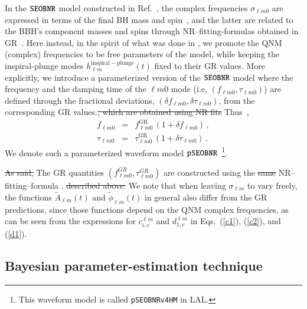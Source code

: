 In the $\texttt{SEOBNR}$ model constructed in Ref.~\cite{Cotesta:2018fcv}, the
complex frequencies $\sigma_{\ell m 0}$ are expressed in terms of the
final BH mass and spin~\cite{Berti:2005ys,Berti:2009kk}, and the
latter are related to the BBH's component masses and spins through
NR--fitting-formulas obtained in
GR~\cite{Taracchini:2013rva,Hofmann:2016yih}. Here instead, in the
spirit of what was done in \paperone, we promote the QNM (complex)
frequencies to be free parameters of the model, while keeping the
inspiral-plunge modes $h_{\ell m}^\mathrm{inspiral-plunge}(t)$ fixed
to their GR values. More explicitly, we introduce a parameterized
version of the $\texttt{SEOBNR}$ model where the frequency and the
damping time of the ${\ell m 0}$ mode (i.e, $(f_{\ell m 0}, \tau
_{\ell m 0})$) are defined through the fractional deviations, $(\delta
f_{\ell m 0},\delta \tau_{\ell m 0})$, from the corresponding GR
values.\sout{, which are obtained using NR fits}
Thus~\cite{Gossan:2011ha,Meidam:2014jpa},
\begin{subequations}
\begin{eqnarray}
f_{\ell m 0} &=& f_{\ell m 0}^{\text{GR}}\, (1 + \delta f_{\ell m 0})\,,\label{eq:nongr_freqs_a} \\ 
\tau _{\ell m 0} &=& \tau _{\ell m 0}^{\text{GR}}\, (1 + \delta \tau_{\ell m 0})\,. \label{eq:nongr_freqs_b}
\end{eqnarray}
\end{subequations}
We denote such a parameterized waveform model $\texttt{pSEOBNR}$~\footnote{This
waveform model is called {\tt pSEOBNRv4HM} in LAL.}.

\sout{As said,} The GR quantities $( f_{\ell m 0}^{GR},\tau_{\ell m 0}^{GR})$ are
constructed using the \sout{same} NR--fitting--formula .
\sout{described above.} We note that when leaving $\sigma_{\ell m}$ to vary
freely, the functions $\tilde{A}_{\ell m}(t)$ and $\tilde{\phi}_{\ell
  m}(t)$ in general also differ from the GR predictions, since
those functions depend on the QNM complex frequencies, as can be seen
from the expressions for $c_{i,c}^{\ell m}$ and $d_{1,c}^{\ell m}$ in Eqs.~(\ref{c1}),
(\ref{c2}), and (\ref{d1}). 


\subsection{Bayesian parameter-estimation technique}
\label{sec:method}

